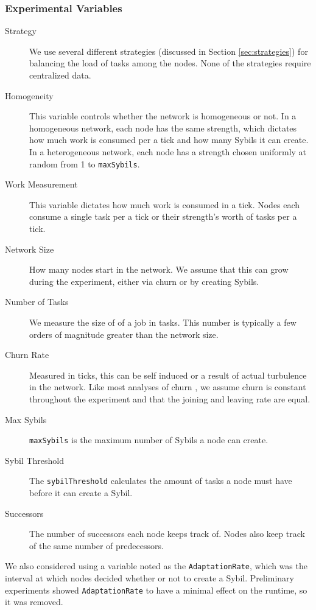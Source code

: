 \subsubsection{Experimental Variables}
\begin{description}
	\item [Strategy] We use several different strategies (discussed in Section \ref{sec:strategies})  for balancing the load  of tasks among the nodes.
	None of the strategies require centralized data.
	\item [Homogeneity]  This variable controls whether the network is homogeneous or not.
	In a homogeneous network, each node has the same strength, which dictates how much work is consumed per a tick and how many Sybils it can create.
	In a heterogeneous network, each node has a strength chosen uniformly at random from 1 to \texttt{maxSybils}.
	\item [Work Measurement] This variable dictates how much work is consumed in a tick.
	Nodes each consume a single task per a tick or their strength's worth of tasks per a tick.
	\item [Network Size]  How many nodes start in the network.  
		We assume that this can grow during the experiment, either via churn or by creating Sybils.
	\item [Number of Tasks] We measure the size of of a job in tasks.
		This number is typically a few orders of magnitude greater than the network size.
	\item [Churn Rate] Measured in ticks, this can be self induced or a result of actual turbulence in the network.
		Like most analyses of churn \cite{marozzo2012p2p}, we assume churn is constant throughout the experiment and that the joining and leaving rate are equal.
	\item [Max Sybils] \texttt{maxSybils} is the maximum number of Sybils a node can create.
	\item [Sybil Threshold] The \texttt{sybilThreshold} calculates the amount of tasks a node must have before it can create a Sybil.
	\item [Successors] The number of successors each node keeps track of.  
	Nodes also keep track of the same number of predecessors.
		
\end{description}

We also considered using a variable noted as the \texttt{AdaptationRate}, which was the interval at which nodes decided whether or not to create a Sybil.
Preliminary experiments  showed \texttt{AdaptationRate} to have a minimal effect on the runtime, so it was removed.

